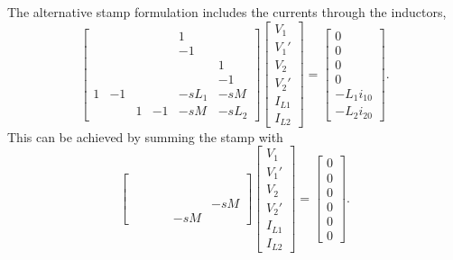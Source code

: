 \documentclass[a4paper, 12pt]{article}
\begin{document}
The alternative stamp formulation includes the currents through the
inductors,
%
\begin{equation}
  \begin{bmatrix}
     &  &  &    &  1 & \\
     &  &  &    & -1 & \\
     &  &  &    &    & 1\\
     &  &  &    &    & -1\\
1 & -1  &  &    & -sL_1 & -sM\\
     &  & 1 & -1 & -sM & -sL_2
  \end{bmatrix}
  \begin{bmatrix}
    V_1 \\ V_1' \\ V_2 \\ V_2' \\ I_{L1} \\ I_{L2}
  \end{bmatrix}
=
\begin{bmatrix}
  0 \\ 0 \\ 0 \\ 0 \\ -L_1 i_{10} \\ -L_2 i_{20}
\end{bmatrix}.
\end{equation}
%
This can be achieved by summing the stamp  with
%
\begin{equation}
  \begin{bmatrix}
     &  &  &    &    & \\
     &  &  &    &    & \\
     &  &  &    &    & \\
     &  &  &    &    & \\
     &  &  &    &    & -sM\\
     &  &  &    & -sM & 
  \end{bmatrix}
  \begin{bmatrix}
    V_1 \\ V_1' \\ V_2 \\ V_2' \\ I_{L1} \\ I_{L2}
  \end{bmatrix}
=
\begin{bmatrix}
  0 \\ 0 \\ 0 \\ 0 \\ 0 \\ 0
\end{bmatrix}.
\end{equation}
\end{document}
